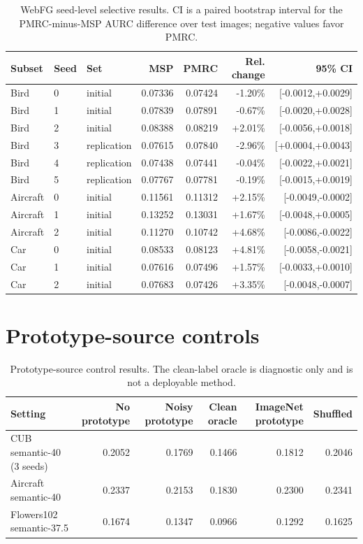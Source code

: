 \documentclass[11pt,a4paper]{article}
\begin{document}
\begin{table}[H]
\centering
\caption{WebFG seed-level selective results. CI is a paired bootstrap interval for the PMRC-minus-MSP AURC difference over test images; negative values favor PMRC.}
\label{tab:webfg-seed-level}
\footnotesize
\setlength{\tabcolsep}{4pt}
\begin{tabular}{@{}lllrrrr@{}}
\toprule
Subset & Seed & Set & MSP & PMRC & Rel. change & 95\% CI \\
\midrule
Bird & 0 & initial & 0.07336 & 0.07424 & -1.20\% & [-0.0012,+0.0029] \\
Bird & 1 & initial & 0.07839 & 0.07891 & -0.67\% & [-0.0020,+0.0028] \\
Bird & 2 & initial & 0.08388 & 0.08219 & +2.01\% & [-0.0056,+0.0018] \\
Bird & 3 & replication & 0.07615 & 0.07840 & -2.96\% & [+0.0004,+0.0043] \\
Bird & 4 & replication & 0.07438 & 0.07441 & -0.04\% & [-0.0022,+0.0021] \\
Bird & 5 & replication & 0.07767 & 0.07781 & -0.19\% & [-0.0015,+0.0019] \\
Aircraft & 0 & initial & 0.11561 & 0.11312 & +2.15\% & [-0.0049,-0.0002] \\
Aircraft & 1 & initial & 0.13252 & 0.13031 & +1.67\% & [-0.0048,+0.0005] \\
Aircraft & 2 & initial & 0.11270 & 0.10742 & +4.68\% & [-0.0086,-0.0022] \\
Car & 0 & initial & 0.08533 & 0.08123 & +4.81\% & [-0.0058,-0.0021] \\
Car & 1 & initial & 0.07616 & 0.07496 & +1.57\% & [-0.0033,+0.0010] \\
Car & 2 & initial & 0.07683 & 0.07426 & +3.35\% & [-0.0048,-0.0007] \\
\bottomrule
\end{tabular}
\end{table}

\section{Prototype-source controls}

\begin{table}[H]
\centering
\caption{Prototype-source control results. The clean-label oracle is diagnostic only and is not a deployable method.}
\label{tab:prototype-source}
\footnotesize
\setlength{\tabcolsep}{3pt}
\begin{tabularx}{\textwidth}{@{}Xrrrrr@{}}
\toprule
Setting & No prototype & Noisy prototype & Clean oracle & ImageNet prototype & Shuffled \\
\midrule
CUB semantic-40 (3 seeds) & 0.2052 & 0.1769 & 0.1466 & 0.1812 & 0.2046 \\
Aircraft semantic-40 & 0.2337 & 0.2153 & 0.1830 & 0.2300 & 0.2341 \\
Flowers102 semantic-37.5 & 0.1674 & 0.1347 & 0.0966 & 0.1292 & 0.1625 \\
\bottomrule
\end{tabularx}
\end{table}
\end{document}
